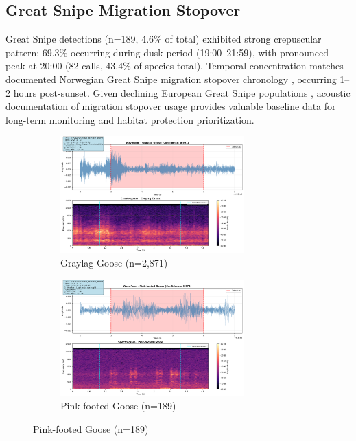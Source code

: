 \documentclass[english,twocolumn]{article}
\begin{document}
\subsection{Great Snipe Migration Stopover}

Great Snipe detections (n=189, 4.6\% of total) exhibited strong crepuscular pattern: 69.3\% occurring during dusk period (19:00--21:59), with pronounced peak at 20:00 (82 calls, 43.4\% of species total). Temporal concentration matches documented Norwegian Great Snipe migration stopover chronology \citep{Kålås1995}, occurring 1--2 hours post-sunset. Given declining European Great Snipe populations \citep{BirdLife2023}, acoustic documentation of migration stopover usage provides valuable baseline data for long-term monitoring and habitat protection prioritization.

\begin{figure}[t]
\centering
\begin{subfigure}{0.47\textwidth}
\centering
\includegraphics[width=\textwidth,height=4.5cm,keepaspectratio]{figures/spectrogram_graylag_goose.png}
\caption{Graylag Goose (n=2,871)}
\end{subfigure}
\hfill
\begin{subfigure}{0.47\textwidth}
\centering
\includegraphics[width=\textwidth,height=4.5cm,keepaspectratio]{figures/spectrogram_pink-footed_goose.png}
\caption{Pink-footed Goose (n=189)}
\end{subfigure}

\vspace{0.3cm}


\end{figure}
\end{document}
